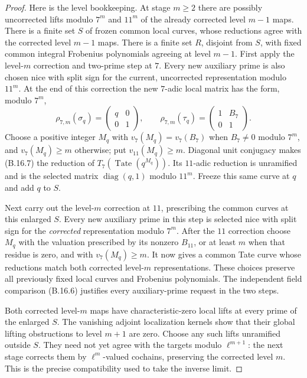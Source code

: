 \begin{proof}
Here is the level bookkeeping.  At stage $m\ge2$ there are
possibly uncorrected lifts modulo $7^m$ and $11^m$ of the
already corrected level $m-1$ maps.  There is a finite set
$S$ of frozen common local curves, whose reductions agree
with the corrected level $m-1$ maps.  There is a finite set
$R$, disjoint from $S$, with fixed common integral Frobenius
polynomials agreeing at level $m-1$.
First apply the level-$m$ correction and two-prime step at $7$.
Every new auxiliary prime is also chosen nice with split sign
for the current, uncorrected representation modulo $11^m$.
At the end of this correction the new $7$-adic local matrix has
the form, modulo $7^m$,
\[
 \rho_{7,m}(\sigma_q)=\begin{pmatrix}q&0\\0&1\end{pmatrix},
 \qquad
 \rho_{7,m}(\tau_q)=\begin{pmatrix}1&B_7\\0&1\end{pmatrix}.
 \tag{B.16.7}
\]
Choose a positive integer $M_q$ with
$v_7(M_q)=v_7(B_7)$ when $B_7\ne0$ modulo $7^m$, and
$v_7(M_q)\ge m$ otherwise; put $v_{11}(M_q)\ge m$.
Diagonal unit conjugacy makes (B.16.7) the reduction of
$T_7(\operatorname{Tate}(q^{M_q}))$.
Its $11$-adic reduction is unramified and is the selected
matrix $\operatorname{diag}(q,1)$ modulo $11^m$.
Freeze this same curve at $q$ and add $q$ to $S$.

Next carry out the level-$m$ correction at $11$, prescribing
the common curves at this enlarged $S$.
Every new auxiliary prime in this step is selected nice with
split sign for the \emph{corrected} representation modulo $7^m$.
After the $11$ correction choose $M_q$ with the valuation
prescribed by its nonzero $B_{11}$, or at least $m$ when that
residue is zero, and with $v_7(M_q)\ge m$.
It now gives a common Tate curve whose reductions match
both corrected level-$m$ representations.
These choices preserve all previously fixed local curves
and Frobenius polynomials.  The independent field comparison
(B.16.6) justifies every auxiliary-prime request in the two steps.

Both corrected level-$m$ maps have characteristic-zero local
lifts at every prime of the enlarged $S$.
The vanishing adjoint localization kernels show that their
global lifting obstructions to level $m+1$ are zero.
Choose any such lifts unramified outside $S$.
They need not yet agree with the targets modulo $\ell^{m+1}$:
the next stage corrects them by $\ell^m$-valued cochains,
preserving the corrected level $m$.  This is the precise
compatibility used to take the inverse limit.


\end{proof}
